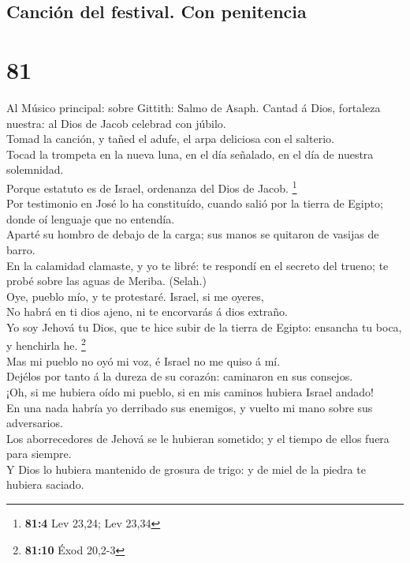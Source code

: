 \hypertarget{canciuxf3n-del-festival.-con-penitencia}{%
\subsection{Canción del festival. Con
penitencia}\label{canciuxf3n-del-festival.-con-penitencia}}

\hypertarget{section-80}{%
\section{81}\label{section-80}}

 Al Músico principal: sobre Gittith: Salmo de Asaph. Cantad
á Dios, fortaleza nuestra: al Dios de Jacob celebrad con júbilo.\\
 Tomad la canción, y tañed el adufe, el arpa deliciosa con
el salterio.\\
 Tocad la trompeta en la nueva luna, en el día señalado, en
el día de nuestra solemnidad.\\
 Porque estatuto es de Israel, ordenanza del Dios de Jacob.
\footnote{\textbf{81:4} Lev 23,24; Lev 23,34}\\
 Por testimonio en José lo ha constituído, cuando salió por
la tierra de Egipto; donde oí lenguaje que no entendía.\\
 Aparté su hombro de debajo de la carga; sus manos se
quitaron de vasijas de barro.\\
 En la calamidad clamaste, y yo te libré: te respondí en el
secreto del trueno; te probé sobre las aguas de Meriba. (Selah.)\\
 Oye, pueblo mío, y te protestaré. Israel, si me oyeres,\\
 No habrá en ti dios ajeno, ni te encorvarás á dios
extraño.\\
 Yo soy Jehová tu Dios, que te hice subir de la tierra de
Egipto: ensancha tu boca, y henchirla he. \footnote{\textbf{81:10} Éxod
  20,2-3}\\
 Mas mi pueblo no oyó mi voz, é Israel no me quiso á mí.\\
 Dejélos por tanto á la dureza de su corazón: caminaron en
sus consejos.\\
 ¡Oh, si me hubiera oído mi pueblo, si en mis caminos
hubiera Israel andado!\\
 En una nada habría yo derribado sus enemigos, y vuelto mi
mano sobre sus adversarios.\\
 Los aborrecedores de Jehová se le hubieran sometido; y el
tiempo de ellos fuera para siempre.\\
 Y Dios lo hubiera mantenido de grosura de trigo: y de miel
de la piedra te hubiera saciado.

